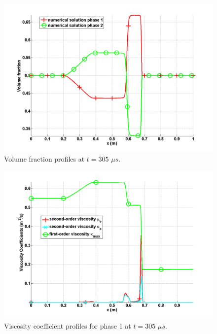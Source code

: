 \begin{figure}[H]
\centering
\includegraphics[width=\textwidth]{figures/SEM/relaxation_two_phases_volume_fraction.png}
\caption{Volume fraction profiles at $t=305$ $\mu s$.}
\label{fig:two-fluids-rel-vf-7-eqn-sect4}
\end{figure}
%
\begin{figure}[H]
\centering
\includegraphics[width=\textwidth]{figures/SEM/relaxation_two_phases_liquid_viscosity_kappa_mu.png}
\caption{Viscosity coefficient profiles for phase 1 at $t=305$ $\mu s$.}
\label{fig:two-fluids-rel-visc-2-7-eqn-sect4}
\end{figure}
%
